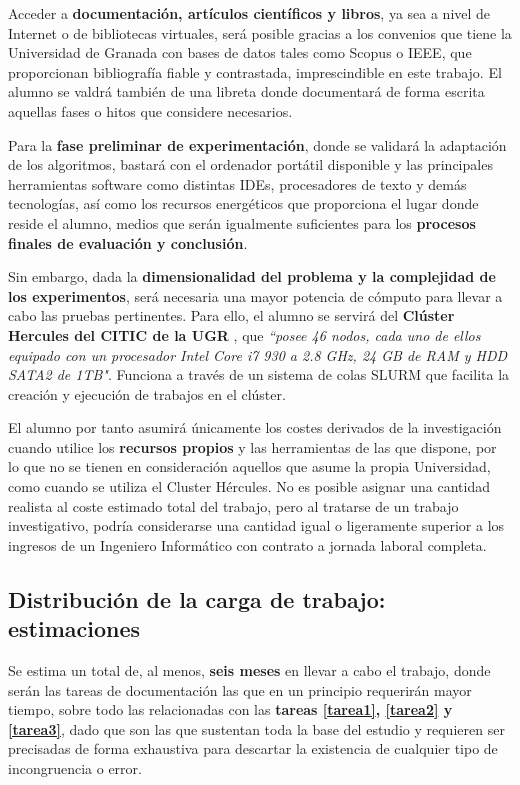 Acceder a \textbf{documentación, artículos científicos y libros}, ya sea a nivel de Internet o de bibliotecas virtuales, será posible gracias a los convenios que tiene la Universidad de Granada con bases de datos tales como Scopus\cite{SCOPUS} o IEEE, que proporcionan bibliografía fiable y contrastada, imprescindible en este trabajo. El alumno se valdrá también de una libreta donde documentará de forma escrita aquellas fases o hitos que considere necesarios.

Para la \textbf{fase preliminar de experimentación}, donde se validará la adaptación de los algoritmos, bastará con el ordenador portátil disponible y las principales herramientas software como distintas IDEs, procesadores de texto y demás tecnologías, así como los recursos energéticos que proporciona el lugar donde reside el alumno, medios que serán igualmente suficientes para los \textbf{procesos finales de evaluación y conclusión}. 

Sin embargo, dada la \textbf{dimensionalidad del problema y la complejidad de los experimentos}, será necesaria una mayor potencia de cómputo para llevar a cabo las pruebas pertinentes. Para ello, el alumno se servirá del \textbf{Clúster Hercules del CITIC de la UGR} \cite{HERCULES}, que \textit{``posee 46 nodos, cada uno de ellos equipado con un procesador Intel Core i7 930 a 2.8 GHz, 24 GB de RAM y HDD SATA2 de 1TB"}. Funciona a través de un sistema de colas SLURM\cite{SLURM} que facilita la creación y ejecución de trabajos en el clúster.

El alumno por tanto asumirá únicamente los costes derivados de la investigación cuando utilice los \textbf{recursos propios} y las herramientas de las que dispone, por lo que no se tienen en consideración aquellos que asume la propia Universidad, como cuando se utiliza el Cluster Hércules. No es posible asignar una cantidad realista al coste estimado total del trabajo, pero al tratarse de un trabajo investigativo, podría considerarse una cantidad igual o ligeramente superior a los ingresos de un Ingeniero Informático con contrato a jornada laboral completa.

\subsection{Distribución de la carga de trabajo: estimaciones}

Se estima un total de, al menos, \textbf{seis meses} en llevar a cabo el trabajo, donde serán las tareas de documentación las que en un principio requerirán mayor tiempo, sobre todo las relacionadas con las \textbf{tareas \ref{tarea1}, \ref{tarea2} y \ref{tarea3}}, dado que son las que sustentan toda la base del estudio y requieren ser precisadas de forma exhaustiva para descartar la existencia de cualquier tipo de incongruencia o error.

